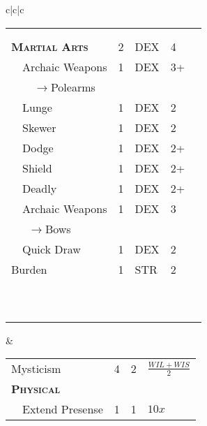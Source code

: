 \documentclass{article}
\begin{document}
\begin{tabular}{c|c|c}
\begin{tabular}{p{1.2in}|p{.15in}|p{.15in}|p{.15in}|p{.15in}}
    & & & & \\
    \hline
    & & & & \\
    \hline
    & & & & \\
    \hline
    \hline
    \hline
    \textsc{\textbf{Martial Arts}} & 2 & \tiny{DEX} & 4 & \\
    \hline
    ~~Archaic Weapons & 1 & \tiny{DEX} & 3+ & \\
    \hline
    ~~~~$\rightarrow$Polearms & & & & \\
    \hline
    ~~Lunge & 1 & \tiny{DEX} & 2 & \\
    \hline
    ~~Skewer & 1 & \tiny{DEX} & 2 & \\
    \hline
    ~~Dodge & 1 & \tiny{DEX} & 2+ & \\
    \hline
    ~~Shield & 1 & \tiny{DEX} & 2+ & \\
    \hline
    ~~Deadly & 1 & \tiny{DEX} & 2+ & \\
    \hline
    ~~Archaic Weapons & 1 & \tiny{DEX} & 3 & \\
    \hline
    ~~~$\rightarrow$Bows & & & & \\
    \hline
    ~~Quick Draw& 1 & \tiny{DEX} & 2 & \\
    \hline
    Burden & 1 & \tiny{STR} & 2 & \\
    \hline
    & & & & \\
    \hline
    & & & & \\
    \hline
    & & & & \\
    \hline
    & & & & \\
    \hline
    & & & & \\
    \hline
    & & & & \\
    \hline
    & & & & \\
    \hline
    & & & & \\
    \hline
    & & & & \\
    \hline
    & & & & \\
  \end{tabular} &
    \begin{tabular}{p{1.4in}|p{.2in}|p{.2in}|p{.2in}}
    \textsmscbf{Name} & \texttyscbf{Rank}
    & \texttyscbf{Time} & \texttyscbf{MP} \\
    \hline
    \hline
    Mysticism & 4 & 2 & \tiny{$\frac{WIL+WIS}{2}$} \\
    \hline
    \hline
    \hline
    \textsc{\textbf{Physical}} & & & \\
    \hline
    ~~Extend Presense & 1 & 1 & $10x$ \\
    \hline

\end{tabular}
\end{tabular}
\end{document}
